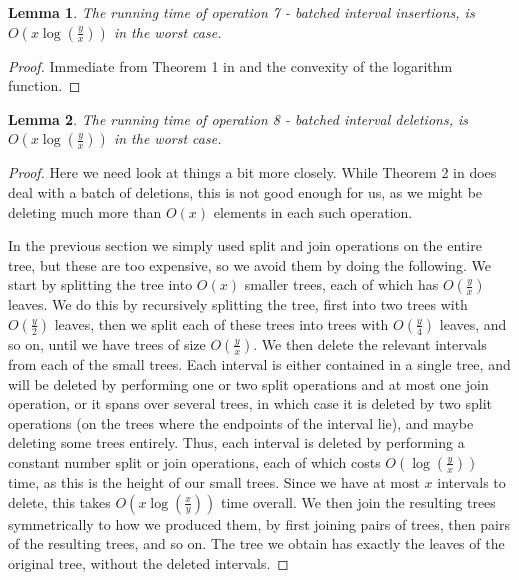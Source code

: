 \documentclass[11pt,a4paper]{article}
\newtheorem{lemma}{Lemma}
\theoremstyle{definition}
\theoremstyle{remark}
\begin{document}
\begin{lemma}\label{Insertions in xlog(y/x) lemma}
The running time of operation 7 - batched interval insertions, is $O(x \log (\frac{y}{x}))$ in the worst case.
\end{lemma}
\begin{proof}
Immediate from Theorem 1 in \cite{Brown1980} and the convexity of the logarithm function.
\end{proof}

\begin{lemma}
The running time of operation 8 - batched interval deletions, is $O(x \log (\frac{y}{x}))$ in the worst case.
\end{lemma}
\begin{proof}
Here we need look at things a bit more closely. While Theorem 2 in \cite{Brown1980} does deal with a batch of deletions, this is not good enough for us, as we might be deleting much more than $O(x)$ elements in each such operation. 

In the previous section we simply used split and join operations on the entire tree, but these are too expensive, so we avoid them by doing the following. We start by splitting the tree into $O(x)$ smaller trees, each of which has $O(\frac{y}{x})$ leaves. We do this by recursively splitting the tree, first into two trees with $O(\frac{y}{2})$ leaves, then we split each of these trees into trees with $O(\frac{y}{4})$ leaves, and so on, until we have trees of size $O(\frac{y}{x})$. We then delete the relevant intervals from each of the small trees. Each interval is either contained in a single tree, and will be deleted by performing one or two split operations and at most one join operation, or it spans over several trees, in which case it is deleted by two split operations (on the trees where the endpoints of the interval lie), and maybe deleting some trees entirely. Thus, each interval is deleted by performing a constant number split or join operations, each of which costs $O(\log (\frac{y}{x}))$ time, as this is the height of our small trees. Since we have at most $x$ intervals to delete, this takes $O(x \log(\frac{x}{y}))$ time overall. We then join the resulting trees symmetrically to how we produced them, by first joining pairs of trees, then pairs of the resulting trees, and so on. The tree we obtain has exactly the leaves of the original tree, without the deleted intervals.


\end{proof}
\end{document}
